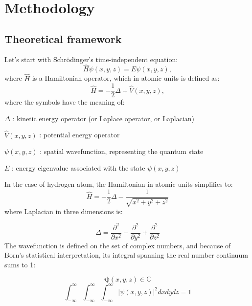 \section{Methodology}

\subsection{Theoretical framework}

Let's start with Schrödinger's time-independent equation:
\begin{equation}
	\hat{H} \psi(x,y,z) = E \psi(x,y,z),
\end{equation}
where \(\hat{H}\) is a Hamiltonian operator, which in atomic units is defined as:
\begin{equation}
	\hat{H} = -\frac{1}{2} \Delta + \hat{V}(x,y,z),
\end{equation}
where the symbols have the meaning of:

\(\Delta\) : kinetic energy operator (or Laplace operator, or Laplacian)

\(\hat{V}(x,y,z)\) : potential energy operator

\(\psi(x,y,z)\) : spatial wavefunction, representing the quantum state

\(E\) : energy eigenvalue associated with the state \(\psi(x,y,z)\)

\noindent In the case of hydrogen atom, the Hamiltonian in atomic units simplifies to:
\begin{equation}
	\hat{H} = -\frac{1}{2}\Delta-\frac{1}{\sqrt{x^2+y^2+z^2}}
\end{equation}
where Laplacian in three dimensions is:

\begin{equation}
	\Delta = \frac{\partial^2}{\partial x^2} + \frac{\partial^2}{\partial y^2} + \frac{\partial^2}{\partial z^2}
\end{equation}
The wavefunction is defined on the set of complex numbers, and because of Born's statistical interpretation, its integral spanning the real number continuum sums to 1:

\begin{equation}
	\boldsymbol{\psi}(x,y,z) \in \mathbb{C}
\end{equation}
\begin{equation}
	\int_{-\infty}^\infty\int_{-\infty}^{\infty}\int_{-\infty}^{\infty}\lvert \psi(x,y,z) \rvert^2 dx dy dz = 1
\end{equation}

